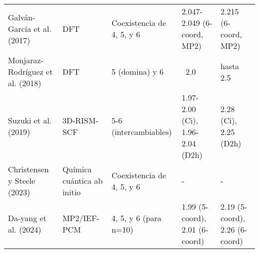 \begin{sidewaystable}
{\begin{tabular}{@{}lllll@{}}
    Galván-García et al. (2017) & DFT                   & Coexistencia de 4, 5, y 6              & 2.047-2.049 (6-coord, MP2)           & 2.215 (6-coord, MP2)                       \\
    Monjaraz-Rodríguez et al. (2018) & DFT              & 5 (domina) y 6                         & ~2.0                                 & hasta 2.5                                  \\
    Suzuki et al. (2019)      & 3D-RISM-SCF             & 5-6 (intercambiables)                  & 1.97-2.00 (Ci), 1.96-2.04 (D2h)      & 2.28 (Ci), 2.25 (D2h)                      \\
    Christensen y Steele (2023) & Química cuántica ab initio & Coexistencia de 4, 5, y 6       & -                                    & -                                          \\
    Da-yang et al. (2024)     & MP2/IEF-PCM             & 4, 5, y 6 (para n=10)                  & 1.99 (5-coord), 2.01 (6-coord)       & 2.19 (5-coord), 2.26 (6-coord)             \\
    \bottomrule
    \end{tabular}
    
    } %
\end{sidewaystable}




